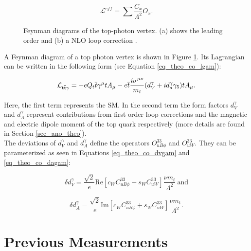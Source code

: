 \begin{equation}
\mathcal{L}^{eff} = \sum{\frac{C_x}{\Lambda^2} O_x }.
\label{eq_theo_co_leff}
\end{equation}
\newpage

\begin{figure}[ht]
  \caption{Feynman diagrams of the top-photon vertex. (a) shows the leading order and (b) a NLO loop correction \cite{tholen:ma}. }
  \label{fig_theo_top_gamvert}
\end{figure}

A Feynman diagram of a top photon vertex is shown in Figure \ref{fig_theo_top_gamvert}. Its Lagrangian can be written in the following form (see Equation \ref{eq_theo_co_lgam}):

\begin{equation}
  \mathcal{L}_{\mathrm{t}\overline{\mathrm{t}} \gamma} = -e Q_t \overline{t} \gamma^{\mu} t A_{\mu} - e \overline{t} \frac{i \sigma^{\mu \nu}}{m_t} (d_V^{\gamma} + i d_a^{\gamma} \gamma_5) t A_{\mu}.
  \label{eq_theo_co_lgam}
  \end{equation}

Here, the first term represents the SM. In the second term the form factors $d_V^{\gamma}$ and $d_A^{\gamma}$ represent contributions from first order loop corrections and the magnetic and electric dipole moment of the top quark respectively (more details are found in Section \ref{sec_ano_theo}). \\
The deviations of $d_V^{\gamma}$ and $d_A^{\gamma}$ define the operators $O_{uB\phi}^{33}$ and $O_{uW}^{33}$. They can be parameterized as seen in Equations \ref{eq_theo_co_dvgam} and \ref{eq_theo_co_dagam}:

\begin{equation}
\delta d_V^{\gamma} = \frac{\sqrt{2}}{e} \mathrm{Re} \left[ c_W C_{uB\phi}^{33} + s_W C_{uW}^{33} \right] \frac{\nu m_t}{\Lambda^2} ~ \mathrm{and}  
\label{eq_theo_co_dvgam}
\end{equation}

\begin{equation}
\delta d_A^{\gamma} = \frac{\sqrt{2}}{e} \mathrm{Im} \left[ c_W C_{uB\phi}^{33} + s_W C_{uW}^{33} \right] \frac{\nu m_t}{\Lambda^2}. 
\label{eq_theo_co_dagam}
\end{equation}

\section{Previous Measurements}

